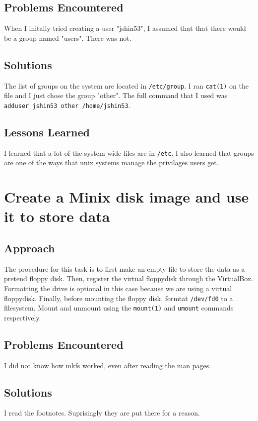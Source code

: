 \documentclass[11pt]{article}
\begin{document}
\subsection{Problems Encountered}
When I initally tried creating a user "jshin53", I assumed that that there would be a group named "users". There was not.

\subsection{Solutions}
The list of groups on the system are located in {\tt /etc/group}. I ran {\tt cat(1)} on the file and I just chose the group "other". The full command that I used was {\tt adduser jshin53 other /home/jshin53}.

\subsection{Lessons Learned}
I learned that a lot of the system wide files are in {\tt /etc}. I also learned that groups are one of the ways that unix systems manage the privilages users get.

\section{Create a {\sc Minix} disk image and use it to store data}
\subsection{Approach}
The procedure for this task is to first make an empty file to store the data as a pretend floppy disk. Then, register the virtual floppydisk through the {\sc VirtualBox}. Formatting the drive is optional in this case because we are using a virtual floppydisk. Finally, before mounting the floppy disk, formtat {\tt /dev/fd0} to a filesystem. Mount and unmount using the {\tt mount(1)} and {\tt umount} commands respectively.

\subsection{Problems Encountered}
I did not know how mkfs worked, even after reading the man pages.

\subsection{Solutions}
I read the footnotes. Suprisingly they are put there for a reason.
\end{document}
